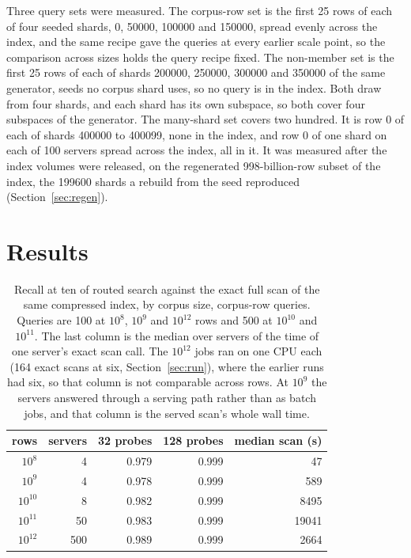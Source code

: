 \documentclass[sigconf, nonacm]{acmart}
\begin{document}
Three query sets were measured. The corpus-row set is the first 25 rows of each of four seeded
shards, 0, 50000, 100000 and 150000, spread evenly across the index, and the same recipe gave the
queries at every earlier scale point, so the comparison across sizes holds the query recipe fixed.
The non-member set is the first 25 rows of each of shards 200000, 250000, 300000 and 350000 of the
same generator, seeds no corpus shard uses, so no query is in the index. Both draw from four
shards, and each shard has its own subspace, so both cover four subspaces of the generator. The
many-shard set covers two hundred. It is row 0 of each of shards 400000 to 400099, none in the
index, and row 0 of one shard on each of 100 servers spread across the index, all in it. It was
measured after the index volumes were released, on the regenerated 998-billion-row subset of the
index, the 199600 shards a rebuild from the seed reproduced (Section~\ref{sec:regen}).

\section{Results}
\label{sec:results}

\begin{table}[t]
\caption{Recall at ten of routed search against the exact full scan of the same compressed
index, by corpus size, corpus-row queries. Queries are 100 at $10^{8}$, $10^{9}$ and $10^{12}$ rows
and 500 at $10^{10}$ and $10^{11}$. The last column is the median over servers of the time of one
server's exact scan call. The $10^{12}$ jobs ran on one CPU each (164 exact scans at six,
Section~\ref{sec:run}), where the earlier runs had six, so that column is not comparable across rows.
At $10^{9}$ the servers answered through a serving path rather than as batch jobs, and that
column is the served scan's whole wall time.}
\label{tab:scale}
\centering
\small
\begin{tabular}{rrrrr}
\toprule
rows & servers & 32 probes & 128 probes & median scan (s) \\
\midrule
$10^{8}$   & 4   & 0.979 & 0.999 & 47 \\
$10^{9}$   & 4   & 0.978 & 0.999 & 589 \\
$10^{10}$  & 8   & 0.982 & 0.999 & 8495 \\
$10^{11}$  & 50  & 0.983 & 0.999 & 19041 \\
$10^{12}$  & 500 & 0.989 & 0.999 & 2664 \\
\bottomrule
\end{tabular}
\end{table}
\end{document}
